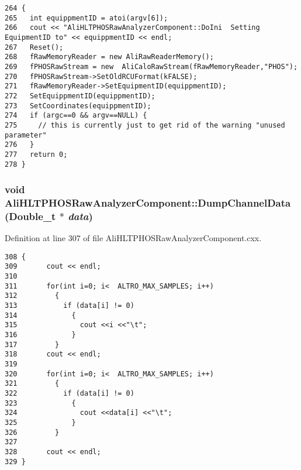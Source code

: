 \footnotesize\begin{verbatim}264 {
265   int equippmentID = atoi(argv[6]);
266   cout << "AliHLTPHOSRawAnalyzerComponent::DoIni  Setting EquipmentID to" << equippmentID << endl;
267   Reset();
268   fRawMemoryReader = new AliRawReaderMemory();
269   fPHOSRawStream = new  AliCaloRawStream(fRawMemoryReader,"PHOS");
270   fPHOSRawStream->SetOldRCUFormat(kFALSE);
271   fRawMemoryReader->SetEquipmentID(equippmentID); 
272   SetEquippmentID(equippmentID);
273   SetCoordinates(equippmentID);
274   if (argc==0 && argv==NULL) {
275     // this is currently just to get rid of the warning "unused parameter"
276   }
277   return 0;
278 }
\end{verbatim}\normalsize 


\subsubsection{\setlength{\rightskip}{0pt plus 5cm}void Ali\-HLTPHOSRaw\-Analyzer\-Component::Dump\-Channel\-Data (Double\_\-t $\ast$ {\em data})\hspace{0.3cm}{\tt  [inherited]}}\label{classAliHLTPHOSRawAnalyzerComponent_AliHLTPHOSRawAnalyzerPeakFinderComponenta9}




Definition at line 307 of file Ali\-HLTPHOSRaw\-Analyzer\-Component.cxx.

\footnotesize\begin{verbatim}308 {
309       cout << endl;
310       
311       for(int i=0; i<  ALTRO_MAX_SAMPLES; i++)
312         {
313           if (data[i] != 0)
314             {
315               cout <<i <<"\t";
316             }
317         }
318       cout << endl;
319       
320       for(int i=0; i<  ALTRO_MAX_SAMPLES; i++)
321         {
322           if (data[i] != 0)
323             {
324               cout <<data[i] <<"\t";
325             }
326         }
327       
328       cout << endl;
329 }
\end{verbatim}\normalsize 


